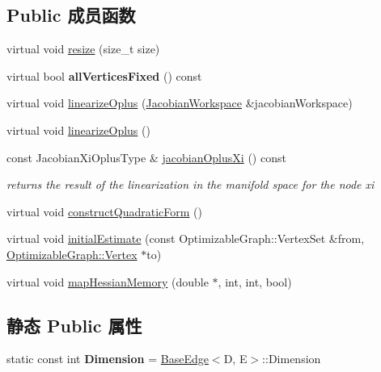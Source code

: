 \subsection*{Public 成员函数}
\begin{DoxyCompactItemize}
\item 
virtual void \hyperlink{classg2o_1_1BaseUnaryEdge_a01fcdfd2d3ed0325655bb99db95c0b10}{resize} (size\-\_\-t size)
\item 
\hypertarget{classg2o_1_1BaseUnaryEdge_ae3db6c719eac18fce051b40a8c8b86dd}{virtual bool {\bfseries all\-Vertices\-Fixed} () const }\label{classg2o_1_1BaseUnaryEdge_ae3db6c719eac18fce051b40a8c8b86dd}

\item 
virtual void \hyperlink{classg2o_1_1BaseUnaryEdge_a8b396647b5b438d30a04758023baa595}{linearize\-Oplus} (\hyperlink{classg2o_1_1JacobianWorkspace}{Jacobian\-Workspace} \&jacobian\-Workspace)
\item 
virtual void \hyperlink{classg2o_1_1BaseUnaryEdge_a367f19b903938faf6e89dd1b0e4e722b}{linearize\-Oplus} ()
\item 
\hypertarget{classg2o_1_1BaseUnaryEdge_a39a254035af4f53fc3a6b5a77cd5a0ca}{const Jacobian\-Xi\-Oplus\-Type \& \hyperlink{classg2o_1_1BaseUnaryEdge_a39a254035af4f53fc3a6b5a77cd5a0ca}{jacobian\-Oplus\-Xi} () const }\label{classg2o_1_1BaseUnaryEdge_a39a254035af4f53fc3a6b5a77cd5a0ca}

\begin{DoxyCompactList}\small\item\em returns the result of the linearization in the manifold space for the node xi \end{DoxyCompactList}\item 
virtual void \hyperlink{classg2o_1_1BaseUnaryEdge_ad7e6dc44c571be159f066bdb961ade2b}{construct\-Quadratic\-Form} ()
\item 
virtual void \hyperlink{classg2o_1_1BaseUnaryEdge_a3d3311901116092cf817b094f6a0b44b}{initial\-Estimate} (const Optimizable\-Graph\-::\-Vertex\-Set \&from, \hyperlink{classg2o_1_1OptimizableGraph_1_1Vertex}{Optimizable\-Graph\-::\-Vertex} $\ast$to)
\item 
virtual void \hyperlink{classg2o_1_1BaseUnaryEdge_a919dcb89130f6e7082e807530facdd78}{map\-Hessian\-Memory} (double $\ast$, int, int, bool)
\end{DoxyCompactItemize}
\subsection*{静态 Public 属性}
\begin{DoxyCompactItemize}
\item 
\hypertarget{classg2o_1_1BaseUnaryEdge_a4e584cf552998a34948d8d5b484f7fd3}{static const int {\bfseries Dimension} = \hyperlink{classg2o_1_1BaseEdge}{Base\-Edge}$<$D, E$>$\-::Dimension}\label{classg2o_1_1BaseUnaryEdge_a4e584cf552998a34948d8d5b484f7fd3}

\end{DoxyCompactItemize}
